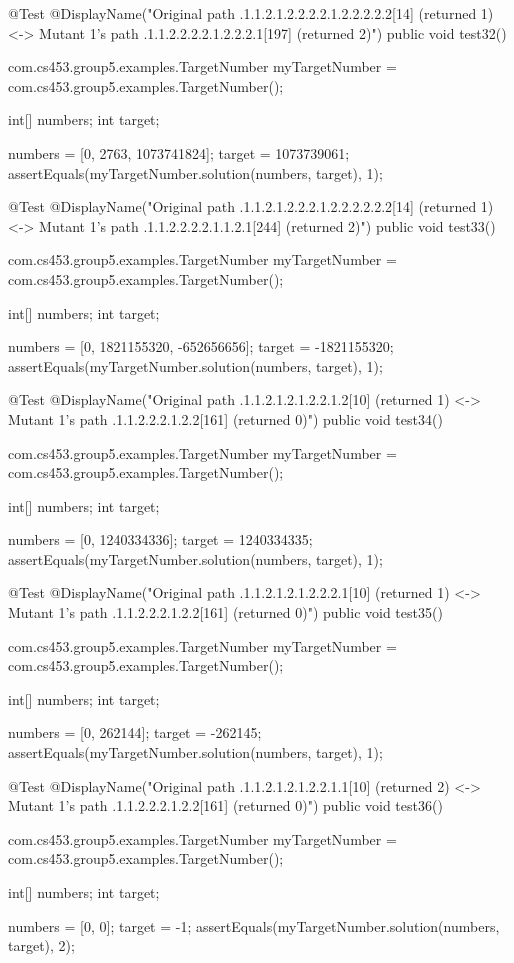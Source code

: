 @Test
@DisplayName("Original path .1.1.2.1.2.2.2.2.1.2.2.2.2.2[14] (returned 1) <-> Mutant 1's path .1.1.2.2.2.2.1.2.2.2.1[197] (returned 2)")
public void test32() {
    com.cs453.group5.examples.TargetNumber myTargetNumber = com.cs453.group5.examples.TargetNumber();

    int[] numbers;
    int target;

    numbers = [0, 2763, 1073741824];
    target = 1073739061;
    assertEquals(myTargetNumber.solution(numbers, target), 1);
}

@Test
@DisplayName("Original path .1.1.2.1.2.2.2.1.2.2.2.2.2.2[14] (returned 1) <-> Mutant 1's path .1.1.2.2.2.2.1.1.2.1[244] (returned 2)")
public void test33() {
    com.cs453.group5.examples.TargetNumber myTargetNumber = com.cs453.group5.examples.TargetNumber();

    int[] numbers;
    int target;

    numbers = [0, 1821155320, -652656656];
    target = -1821155320;
    assertEquals(myTargetNumber.solution(numbers, target), 1);
}

@Test
@DisplayName("Original path .1.1.2.1.2.1.2.2.1.2[10] (returned 1) <-> Mutant 1's path .1.1.2.2.2.1.2.2[161] (returned 0)")
public void test34() {
    com.cs453.group5.examples.TargetNumber myTargetNumber = com.cs453.group5.examples.TargetNumber();

    int[] numbers;
    int target;

    numbers = [0, 1240334336];
    target = 1240334335;
    assertEquals(myTargetNumber.solution(numbers, target), 1);
}

@Test
@DisplayName("Original path .1.1.2.1.2.1.2.2.2.1[10] (returned 1) <-> Mutant 1's path .1.1.2.2.2.1.2.2[161] (returned 0)")
public void test35() {
    com.cs453.group5.examples.TargetNumber myTargetNumber = com.cs453.group5.examples.TargetNumber();

    int[] numbers;
    int target;

    numbers = [0, 262144];
    target = -262145;
    assertEquals(myTargetNumber.solution(numbers, target), 1);
}

@Test
@DisplayName("Original path .1.1.2.1.2.1.2.2.1.1[10] (returned 2) <-> Mutant 1's path .1.1.2.2.2.1.2.2[161] (returned 0)")
public void test36() {
    com.cs453.group5.examples.TargetNumber myTargetNumber = com.cs453.group5.examples.TargetNumber();

    int[] numbers;
    int target;

    numbers = [0, 0];
    target = -1;
    assertEquals(myTargetNumber.solution(numbers, target), 2);
}

